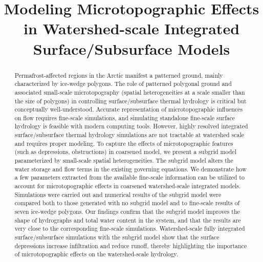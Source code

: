 \documentclass[review,11pt]{elsarticle}
\begin{document}
\begin{frontmatter}

\title{Modeling Microtopographic Effects in Watershed-scale Integrated Surface/Subsurface Models}





\begin{abstract}
Permafrost-affected regions in the Arctic manifest a patterned ground, mainly characterized by ice-wedge polygons. The role of patterned polygonal ground and associated small-scale microtopography (spatial heterogeneities at a scale smaller than the size of polygons) in controlling surface/subsurface thermal hydrology is critical but conceptually well-understood. Accurate representation of microtopographic influences on flow requires fine-scale simulations, and simulating standalone fine-scale surface hydrology is feasible with modern computing tools. However, highly resolved integrated surface/subsurface thermal hydrology simulations are not tractable at watershed scale and requires proper modeling. To capture the effects of microtopographic features (such as depressions, obstructions) in coarsened model, we present a subgrid model parameterized by small-scale spatial heterogeneities.  The subgrid model alters the water storage and flow terms in the existing governing equations. We demonstrate how a few parameters extracted from the available fine-scale information can be utilized to account for microtopographic effects in coarsened watershed-scale integrated models.
Simulations were carried out and numerical results of the subgrid model were compared both to those generated with no subgrid model and to fine-scale results of seven ice-wedge polygons. Our findings confirm that the subgrid model improves the shape of hydrographs and total water content in the system, and that the results are very close to the corresponding fine-scale simulations. Watershed-scale fully integrated surface/subsurface simulations with the subgrid model show that the surface depressions increase infiltration and reduce runoff, thereby highlighting the importance of microtopographic effects on the watershed-scale hydrology.
\end{abstract}


\end{frontmatter}
\end{document}
